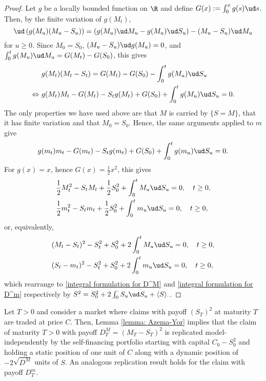 \documentclass[11pt]{article}
\begin{document}
\begin{proof}

Let $g$ be a locally bounded function on $\R$ and define $G(x) := \int_0^x g(s) \ud s$. Then, by the finite variation of $g(M_t)$,
$$
\ud \left( g(M_u) (M_u - S_u) \right) =  (g(M_u) \ud M_u - g(M_u) \ud S_u) - (M_u - S_u) \ud M_u
$$
for $u \geq 0$. Since $M_0 = S_0$, $(M_u - S_u) \ud g(M_u) = 0$, and $\int_0^t g(M_u) \ud M_u = G(M_t) - G(S_0)$, this gives
\begin{align*}
&g(M_t) (M_t - S_t) = G(M_t) - G(S_0) - \int_0^t g(M_u) \ud S_u \\
\Leftrightarrow \ &g(M_t) M_t - G(M_t) - S_t g(M_t) + G(S_0) + \int_0^t g(M_u) \ud S_u = 0.
\end{align*}
The only properties we have used above are that $M$ is carried by $\{S = M\}$, that it has finite variation and that $M_0 = S_0$. Hence, the same arguments applied to $m$ give
$$
g(m_t) m_t - G(m_t) - S_t g(m_t) + G(S_0) + \int_0^t g( m_u ) \ud S_u = 0.
$$
For $g(x) = x$, hence $G(x) = \frac{1}{2} x^2$, this gives
\begin{align*}
&\frac{1}{2} M_t^2 - S_t M_t + \frac{1}{2} S_0^2 + \int_0^t M_u \ud S_u = 0, \quad t \geq 0, \\
&\frac{1}{2} m_t^2 - S_t m_t + \frac{1}{2} S_0^2 + \int_0^t m_u \ud S_u = 0, \quad t \geq 0,
\end{align*}
or, equivalently,
\begin{align*}
& (M_t - S_t)^2 - S_t^2 + S_0^2 + 2 \int_0^t M_u \ud S_u = 0, \quad t \geq 0, \\
& (S_t - m_t)^2 - S_t^2 + S_0^2 + 2 \int_0^t m_u \ud S_u = 0, \quad t \geq 0,
\end{align*}
which rearrange to \eqref{integral formulation for D^M} and \eqref{integral formulation for D^m} respectively by $S^2_\cdot = S_0^2 + 2 \int_0^\cdot S_u \ud S_u + \langle S \rangle_\cdot$.

\end{proof}

\begin{remark}
Let $T > 0$ and consider a market where claims with payoff $(S_T)^2$ at maturity $T$ are traded at price $C$. Then, Lemma \ref{lemma: Azema-Yor} implies that the claim of maturity $T > 0$ with payoff $D^M_T = (M_T - S_T)^2$ is replicated model-independently by the self-financing portfolio starting with capital $C_0 - S_0^2$ and holding a static position of one unit of $C$ along with a dynamic position of $-2 \sqrt{D^M}$ units of $S$. An analogous replication result holds for the claim with payoff $D^m_T$.
\end{remark}
\end{document}
